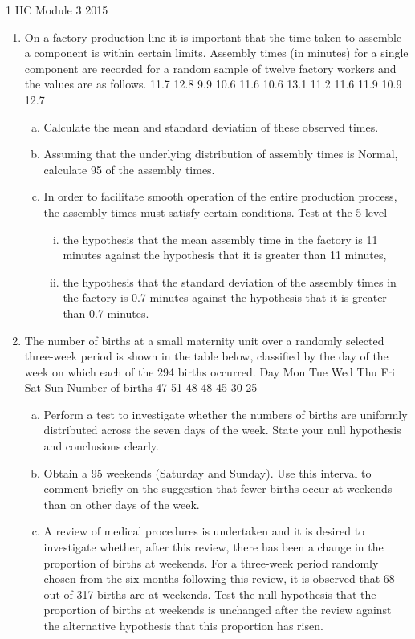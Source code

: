 1 HC Module 3 2015

\begin{enumerate}
\item  On a factory production line it is important that the time taken to assemble a
component is within certain limits. Assembly times (in minutes) for a single
component are recorded for a random sample of twelve factory workers and the values
are as follows.
11.7 12.8 9.9 10.6 11.6 10.6 13.1 11.2 11.6 11.9 10.9 12.7
\begin{enumerate}[(a)]
\item  Calculate the mean and standard deviation of these observed times.
\item Assuming that the underlying distribution of assembly times is Normal,
calculate 95%
of the assembly times.
\item In order to facilitate smooth operation of the entire production process, the
assembly times must satisfy certain conditions. Test at the 5%
level
\begin{enumerate}[(i)]
\item the hypothesis that the mean assembly time in the factory is 11 minutes
against the hypothesis that it is greater than 11 minutes,
\item the hypothesis that the standard deviation of the assembly times in the
factory is 0.7 minutes against the hypothesis that it is greater than
0.7 minutes.
\end{enumerate}
\end{enumerate}

\item The number of births at a small maternity unit over a randomly selected three-week
period is shown in the table below, classified by the day of the week on which each of
the 294 births occurred.
Day Mon Tue Wed Thu Fri Sat Sun
Number of births 47 51 48 48 45 30 25
\begin{enumerate}[(a)]
\item  Perform a test to investigate whether the numbers of births are uniformly
distributed across the seven days of the week. State your null hypothesis and
conclusions clearly.
\item Obtain a 95%
weekends (Saturday and Sunday). Use this interval to comment briefly on the
suggestion that fewer births occur at weekends than on other days of the week.
\item A review of medical procedures is undertaken and it is desired to investigate
whether, after this review, there has been a change in the proportion of births at
weekends. For a three-week period randomly chosen from the six months
following this review, it is observed that 68 out of 317 births are at weekends.
Test the null hypothesis that the proportion of births at weekends is unchanged
after the review against the alternative hypothesis that this proportion has risen.
\end{enumerate}


\end{enumerate}

